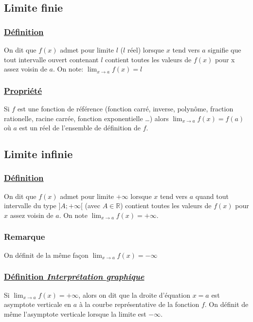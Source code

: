 \documentclass[9pt,twoside]{article}
\begin{document}
\subsection{Limite finie}

\subsubsection*{\underline{Définition}}

On dit que $f(x)$ admet pour limite $l$ ($l$ réel) lorsque $x$ tend vers $a$ signifie que tout intervalle ouvert contenant $l$ contient toutes les valeurs de $f(x)$ pour x assez voisin de $a$. On note: $\lim_{x \to a} f(x) = l$

\subsubsection*{\underline{Propriété}}

Si $f$ est une fonction de référence (fonction carré, inverse, polynôme, fraction rationelle, racine carrée, fonction exponentielle \dots) alors $\lim_{x \to a}f(x) = f(a)$ où $a$ est un réel de l'ensemble de définition de $f$.

\subsection{Limite infinie}

\subsubsection*{\underline{Définition}}
On dit que $f(x)$ admet pour limite $+\infty$ lorsque $x$ tend vers $a$ quand tout intervalle du type $]A;+\infty[$ (avec $A \in \mathbb{R}$) contient toutes les valeurs de $f(x)$ pour $x$ assez voisin de $a$. On note $\lim_{x \to a} f(x)=+\infty$.

\subsubsection*{Remarque}

On définit de la même façon $\lim_{x \to a}f(x)=-\infty$

\subsubsection*{\underline{Définition \textmd{\textit{Interprétation graphique}}}}

Si $\lim_{x \to a}f(x)=+\infty$, alors on dit que la droite d'équation $x=a$ est asymptote verticale en $a$ à la courbe représentative de la fonction $f$. On définit de même l'asymptote verticale lorsque la limite est $-\infty$.
\end{document}
